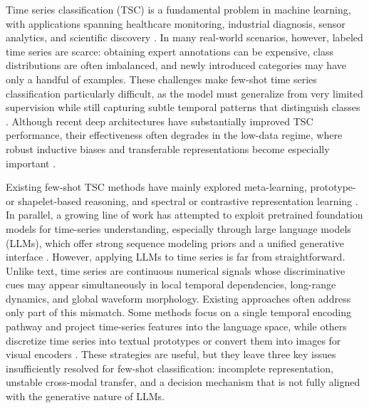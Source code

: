 \documentclass{article}
\begin{document}
    Time series classification (TSC) is a fundamental problem in machine learning, with applications spanning healthcare monitoring, industrial diagnosis, sensor analytics, and scientific discovery \cite{ismail2019deep}. In many real-world scenarios, however, labeled time series are scarce: obtaining expert annotations can be expensive, class distributions are often imbalanced, and newly introduced categories may have only a handful of examples. These challenges make few-shot time series classification particularly difficult, as the model must generalize from very limited supervision while still capturing subtle temporal patterns that distinguish classes \cite{tang2020interpretable}. Although recent deep architectures have substantially improved TSC performance, their effectiveness often degrades in the low-data regime, where robust inductive biases and transferable representations become especially important \cite{pan2024review}.
    
    Existing few-shot TSC methods have mainly explored meta-learning, prototype- or shapelet-based reasoning, and spectral or contrastive representation learning \cite{barreda2024cosco,tang2020interpretable,yang2022spectral}. In parallel, a growing line of work has attempted to exploit pretrained foundation models for time-series understanding, especially through large language models (LLMs), which offer strong sequence modeling priors and a unified generative interface \cite{zhang2024large,jin2024time,cheng2024advancing}. However, applying LLMs to time series is far from straightforward. Unlike text, time series are continuous numerical signals whose discriminative cues may appear simultaneously in local temporal dependencies, long-range dynamics, and global waveform morphology. Existing approaches often address only part of this mismatch. Some methods focus on a single temporal encoding pathway and project time-series features into the language space, while others discretize time series into textual prototypes or convert them into images for visual encoders \cite{zhang2024large,jin2024time,cheng2024advancing}. These strategies are useful, but they leave three key issues insufficiently resolved for few-shot classification: incomplete representation, unstable cross-modal transfer, and a decision mechanism that is not fully aligned with the generative nature of LLMs.
    
\end{document}
